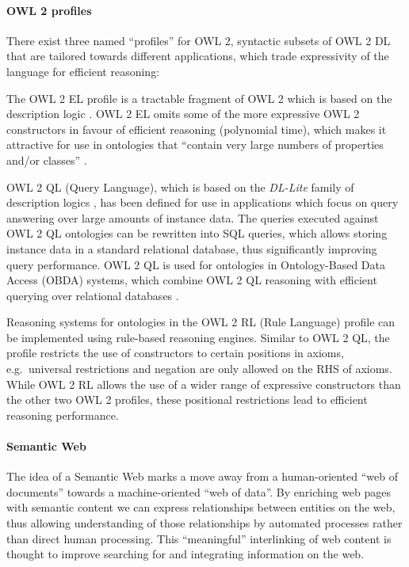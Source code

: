 \paragraph{OWL 2 profiles}

There exist three named \enquote{profiles} for OWL 2, syntactic subsets of OWL 2 DL that are tailored towards different applications, which trade expressivity of the language for efficient reasoning:

The OWL 2 EL profile is a tractable fragment of OWL 2 which is based on the description logic \elplusplus \cite{baader05aj}. OWL 2 EL omits some of the more expressive OWL 2 constructors in favour of efficient reasoning (polynomial time), which makes it attractive for use in ontologies that \enquote{contain very large numbers of properties and/or classes} \cite{owl2profiles2009}.

OWL 2 QL (Query Language), which is based on the \emph{DL-Lite} family of description logics \cite{artale2009aa}, has been defined for use in applications which focus on query answering over large amounts of instance data. The queries executed against OWL 2 QL ontologies can be rewritten into SQL queries, which allows storing instance data in a standard relational database, thus significantly improving query performance. OWL 2 QL is used for ontologies in  Ontology-Based Data Access (OBDA) systems, which combine OWL 2 QL reasoning with efficient querying over relational databases \cite{calvanese2011aa,rodriguez-muro2012aa}.

Reasoning systems for ontologies in the OWL 2 RL (Rule Language) profile can be implemented using rule-based reasoning engines. Similar to OWL 2 QL, the profile restricts the use of constructors to certain positions in axioms, e.g.\ universal restrictions and negation are only allowed on the RHS of axioms. While OWL 2 RL allows the use of a wider range of expressive constructors than the other two OWL 2 profiles, these positional restrictions lead to efficient reasoning performance.

\paragraph{Semantic Web} The idea of a Semantic Web \cite{berners-lee01bf} marks a move away from a human-oriented  \enquote{web of documents} towards a machine-oriented \enquote{web of data}. By enriching web pages with semantic content we can express relationships between entities on the web, thus allowing understanding of those relationships by automated processes rather than direct human processing. This \enquote{meaningful} interlinking of web content is thought to improve searching for and integrating information on the web. 

